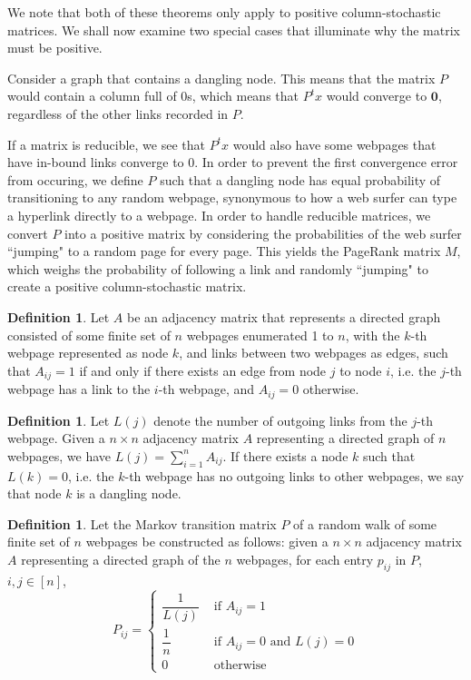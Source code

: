 \documentclass[11pt]{article}
\theoremstyle{definition}
\newtheorem{definition}[theorem]{Definition}
\renewcommand{\vec}[1]{\mathbf{#1}}
\begin{document}

We note that both of these theorems only apply to positive column-stochastic matrices.
We shall now examine two special cases that illuminate why the matrix must be positive.


Consider a graph that contains a dangling node. This means that the matrix $P$ would contain a column full of 0s, which means that $P^tx$ would converge to $\vec{0}$, regardless of the other links recorded in $P$.

If a matrix is reducible, we see that $P^tx$ would also have some webpages that have in-bound links converge to 0.
In order to prevent the first convergence error from occuring, we define $P$ such that a dangling node has equal probability of transitioning to any random webpage, synonymous to how a web surfer can type a hyperlink directly to a webpage.
In order to handle reducible matrices, we convert $P$ into a positive matrix by considering the probabilities of the web surfer ``jumping" to a random page for every page. This yields the PageRank matrix $M$, which weighs the probability of following a link and randomly ``jumping" to create a positive column-stochastic matrix.


\begin{definition}
    Let $A$ be an adjacency matrix that represents a directed graph consisted of some finite set of $n$ webpages enumerated 1 to $n$,
    with the $k$-th webpage represented as node $k$, and links between two webpages as edges,
    such that $A_{ij} = 1$ if and only if there exists an edge from node $j$ to node $i$, i.e. the $j$-th webpage has a link to the $i$-th webpage, and $A_{ij} = 0$ otherwise.
\end{definition}

\begin{definition}
    Let $L(j)$ denote the number of outgoing links from the $j$-th webpage.
    Given a $n \times n$ adjacency matrix $A$ representing a directed graph of $n$ webpages, 
    we have $L(j) = \sum_{i = 1}^n A_{ij}$.
    If there exists a node $k$ such that $L(k) = 0$, i.e. the $k$-th webpage has no outgoing links to other webpages, we say that node $k$ is a dangling node.
\end{definition}

\begin{definition}
    Let the Markov transition matrix $P$ of a random walk of some finite set of $n$ webpages be constructed as follows:
    given a $n \times n$ adjacency matrix $A$ representing a directed graph of the $n$ webpages,
    for each entry $p_{ij}$ in $P$, $i,j \in [n]$,
    $$ P_{ij} = \begin{cases}
        \dfrac{1}{L(j)} & \text{ if } A_{ij} = 1 \\
        \dfrac{1}{n} & \text{ if } A_{ij} = 0 \text{ and } L(j) = 0 \\
        0 & \text{ otherwise }
    \end{cases}$$
\end{definition}
\end{document}

